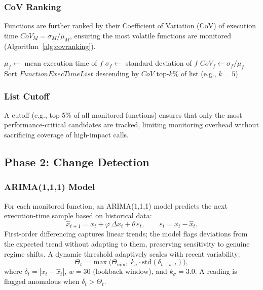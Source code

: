 \documentclass[a4paper,fleqn]{cas-sc}
\theoremstyle{plain}
\begin{document}
\subsubsection{CoV Ranking}
Functions are further ranked by their Coefficient of Variation (CoV) of
execution time $CoV_M = \sigma_M / \mu_M$, ensuring the most volatile
functions are monitored (Algorithm~\ref{alg:covranking}).

\begin{algorithm}[tbp]
  \caption{CoV Ranking of Function Calls}\label{alg:covranking}
  \begin{algorithmic}[1]
      \State $\mu_f \leftarrow$ mean execution time of $f$
      \State $\sigma_f \leftarrow$ standard deviation of $f$
      \State $CoV_f \leftarrow \sigma_f / \mu_f$
    \EndFor
    \State Sort $FunctionExecTimeList$ descending by $CoV$
    \State \Return top-$k\%$ of list (e.g., $k=5$)
  \end{algorithmic}
\end{algorithm}

\subsubsection{List Cutoff}
A cutoff (e.g., top-5\% of all monitored functions) ensures that only the
most performance-critical candidates are tracked, limiting monitoring overhead
without sacrificing coverage of high-impact calls.

\subsection{Phase 2: Change Detection}\label{sec:framework:phase2}

\subsubsection{ARIMA(1,1,1) Model}
For each monitored function, an ARIMA(1,1,1) model predicts the next
execution-time sample based on historical data:
\begin{equation}
  \hat{x}_{t+1} = x_t + \varphi\,\Delta x_t + \theta\,\varepsilon_t,
  \qquad \varepsilon_t = x_t - \hat{x}_t.
  \label{eq:arima}
\end{equation}
First-order differencing captures linear trends; the model flags deviations
from the expected trend without adapting to them, preserving sensitivity to
genuine regime shifts.
A dynamic threshold adaptively scales with recent variability:
\begin{equation}
  \Theta_t = \max\!\bigl(\Theta_{\min},\; k_\sigma \cdot
  \mathrm{std}(\delta_{t-w:t})\bigr),
  \label{eq:dyn_thresh}
\end{equation}
where $\delta_t = |x_t - \hat{x}_t|$, $w = 30$ (lookback window), and
$k_\sigma = 3.0$.
A reading is flagged anomalous when $\delta_t > \Theta_t$.
\end{document}

